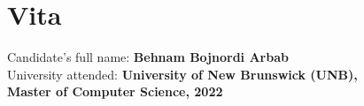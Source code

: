 \clearpage
{}  %
\chapter*{Vita}
\pagestyle{empty}
\thispagestyle{empty}
\singlespacing
Candidate's full name:
\textbf{Behnam Bojnordi Arbab}\\
University attended:
\textbf{University of New Brunswick (UNB),\\
Master of Computer Science, 2022}\\
